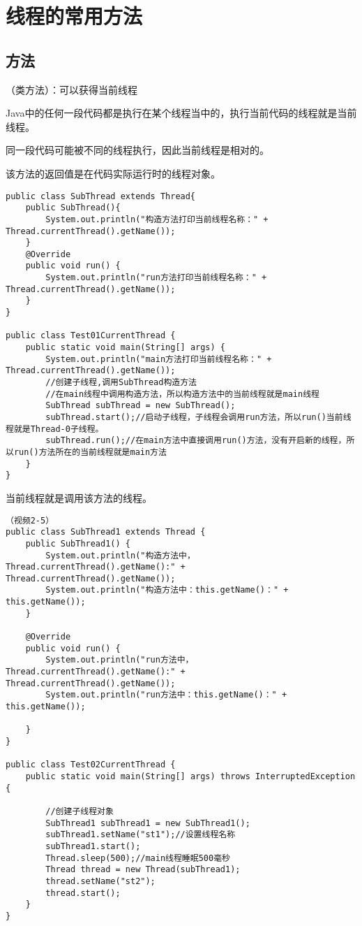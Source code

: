 \documentclass[a4paper]{report}
\begin{document}
\section{线程的常用方法}
\subsection{方法}
（类方法）：可以获得当前线程

Java中的任何一段代码都是执行在某个线程当中的，执行当前代码的线程就是当前线程。

同一段代码可能被不同的线程执行，因此当前线程是相对的。

该方法的返回值是在代码实际运行时的线程对象。

\begin{lstlisting}
public class SubThread extends Thread{
    public SubThread(){
        System.out.println("构造方法打印当前线程名称：" + Thread.currentThread().getName());
    }
    @Override
    public void run() {
        System.out.println("run方法打印当前线程名称：" + Thread.currentThread().getName());
    }
}

public class Test01CurrentThread {
    public static void main(String[] args) {
        System.out.println("main方法打印当前线程名称：" + Thread.currentThread().getName());
        //创建子线程,调用SubThread构造方法
        //在main线程中调用构造方法，所以构造方法中的当前线程就是main线程
        SubThread subThread = new SubThread();
        subThread.start();//启动子线程，子线程会调用run方法，所以run()当前线程就是Thread-0子线程。
        subThread.run();//在main方法中直接调用run()方法，没有开启新的线程，所以run()方法所在的当前线程就是main方法
    }
}
\end{lstlisting}
当前线程就是调用该方法的线程。


\begin{lstlisting}[title=复杂一点的代码]（视频2-5）
public class SubThread1 extends Thread {
    public SubThread1() {
        System.out.println("构造方法中，Thread.currentThread().getName():" + Thread.currentThread().getName());
        System.out.println("构造方法中：this.getName()：" + this.getName());
    }

    @Override
    public void run() {
        System.out.println("run方法中，Thread.currentThread().getName():" + Thread.currentThread().getName());
        System.out.println("run方法中：this.getName()：" + this.getName());

    }
}

public class Test02CurrentThread {
    public static void main(String[] args) throws InterruptedException {

        //创建子线程对象
        SubThread1 subThread1 = new SubThread1();
        subThread1.setName("st1");//设置线程名称
        subThread1.start();
        Thread.sleep(500);//main线程睡眠500毫秒
        Thread thread = new Thread(subThread1);
        thread.setName("st2");
        thread.start();
    }
}
\end{lstlisting}
\end{document}
